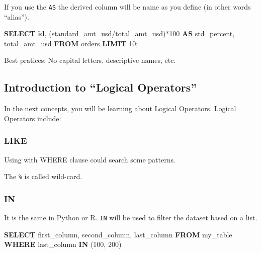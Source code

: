 \documentclass[]{book}
\newenvironment{Shaded}{\begin{snugshade}}{\end{snugshade}}
\newcommand{\KeywordTok}[1]{\textcolor[rgb]{0.13,0.29,0.53}{\textbf{#1}}}
\newcommand{\DecValTok}[1]{\textcolor[rgb]{0.00,0.00,0.81}{#1}}
\newcommand{\StringTok}[1]{\textcolor[rgb]{0.31,0.60,0.02}{#1}}
\newcommand{\NormalTok}[1]{#1}
\begin{document}
If you use the \texttt{AS} the derived column will be name as you define
(in other words ``alias'').

\begin{Shaded}
\begin{Highlighting}[]
\KeywordTok{SELECT} \KeywordTok{id}\NormalTok{, (standard_amt_usd/total_amt_usd)*}\DecValTok{100} \KeywordTok{AS}\NormalTok{ std_percent, total_amt_usd}
\KeywordTok{FROM}\NormalTok{ orders}
\KeywordTok{LIMIT} \DecValTok{10}\NormalTok{;}
\end{Highlighting}
\end{Shaded}

Best pratices: No capital letters, descriptive names, etc.

\subsection{\texorpdfstring{Introduction to ``Logical
Operators''}{Introduction to Logical Operators}}\label{introduction-to-logical-operators}

In the next concepts, you will be learning about Logical Operators.
Logical Operators include:

\subsubsection{LIKE}\label{like}

Using with WHERE clause could search some patterns.

\begin{Shaded}
\end{Shaded}

The \texttt{\%} is called wild-card.

\subsubsection{IN}\label{in}

It is the same in Python or R. \texttt{IN} will be used to filter the
dataset based on a list.

\begin{Shaded}
\begin{Highlighting}[]
\KeywordTok{SELECT}\NormalTok{ first_column, second_column, last_column}
  \KeywordTok{FROM}\NormalTok{ my_table}
\KeywordTok{WHERE}\NormalTok{ last_column }\KeywordTok{IN}\NormalTok{ (}\DecValTok{100}\NormalTok{, }\DecValTok{200}\NormalTok{)}
\end{Highlighting}
\end{Shaded}
\end{document}
